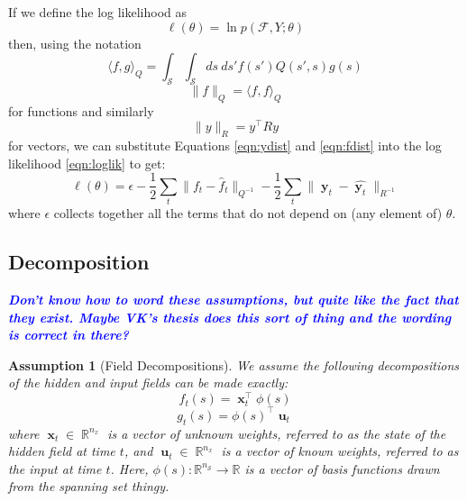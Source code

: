 \documentclass{IEEEtran}
\newcommand{\todo}[1]{\textsf{\emph{\textbf{\textcolor{blue}{#1}}}}}
\newcommand{\inner}[3]{\langle#1,#2\rangle_{#3}}
\newcommand{\dist}[2]{\|#1\|_{#2}}
\DeclareMathOperator{\R}{\mathbb{R}}
\DeclareMathOperator{\xvec}{\mathbf{x}}
\DeclareMathOperator{\uvec}{\mathbf{u}}
\DeclareMathOperator{\yvec}{\mathbf{y}}
\DeclareMathOperator{\onto}{\rightarrow}
\newtheorem{assumption}{Assumption}
\begin{document}
If we define the log likelihood as
\begin{equation}
	\label{eqn:loglik}
	\ell(\theta) = \ln p(\mathcal{F}, Y;\theta)
\end{equation}
then, using the notation
\begin{equation}
	\inner{f}{g}{Q} = \int_\mathcal{S} \int_\mathcal{S} ds~ds' f(s') Q(s',s) g(s)
\end{equation}
\begin{equation}
	\dist{f}{Q} = \inner{f}{f}{Q}
\end{equation}
for functions and similarly
\begin{equation}
	\dist{y}{R} = y^\top Ry
\end{equation}
for vectors, we can substitute Equations \ref{eqn:ydist} and \ref{eqn:fdist} into the log likelihood \ref{eqn:loglik} to get:
\begin{equation}
	\ell(\theta) =  \epsilon  - \frac{1}{2}\sum_t\dist{f_t - \hat{f}_t}{Q^{-1}} - \frac{1}{2}\sum_t\dist{\yvec_t-\hat{\yvec_t}}{R^{-1}}
\end{equation}
where $\epsilon$ collects together all the terms that do not depend on (any element of) $\theta$.

\subsection{Decomposition}

\todo{Don't know how to word these assumptions, but quite like the fact that they exist. Maybe VK's thesis does this sort of thing and the wording is correct in there?}

\begin{assumption}[Field Decompositions]
	\label{ass:fielddecomp}
	We assume the following decompositions of the hidden and input fields can be made exactly:
\begin{equation}
	\label{eq:f decomp}
	f_t(s) = \xvec_t^\top\phi(s)
\end{equation}
\begin{equation}
	g_t(s) = \phi(s)^\top\uvec_t
\end{equation}	 
where $\xvec_t \in \R^{n_x}$ is a vector of unknown weights, referred to as the state of the hidden field at time $t$, and $\uvec_t \in \R^{n_x}$ is a vector of known weights, referred to as the input at time $t$. Here, $\phi(s) : \mathbb{R}^{n_\mathcal{S}} \onto \mathbb{R}$ is a vector of basis functions drawn from the spanning set thingy.
\end{assumption}
\end{document}
